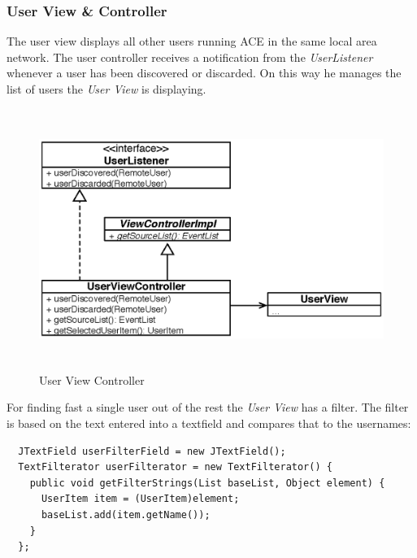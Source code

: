 \subsubsection{User View \& Controller}
The user view displays all other users running ACE in the same local area network. The user controller receives a notification from the \textit{UserListener} whenever a user has been discovered or discarded. On this way he manages the list of users the \textit{User View} is displaying.
\begin{figure}[H]
\begin{center}
  \includegraphics[height=3.33in, width=5.62in]{../images/finalreport/application_userview.eps}
\caption{User View Controller}
\label{application_userview}
\end{center}
\end{figure}
For finding fast a single user out of the rest the \textit{User View} has a filter. The filter is based on the text entered into a textfield and compares that to the usernames:
\begin{verbatim}
  JTextField userFilterField = new JTextField();
  TextFilterator userFilterator = new TextFilterator() {
    public void getFilterStrings(List baseList, Object element) {
      UserItem item = (UserItem)element;
      baseList.add(item.getName());
    }
  };
\end{verbatim}

